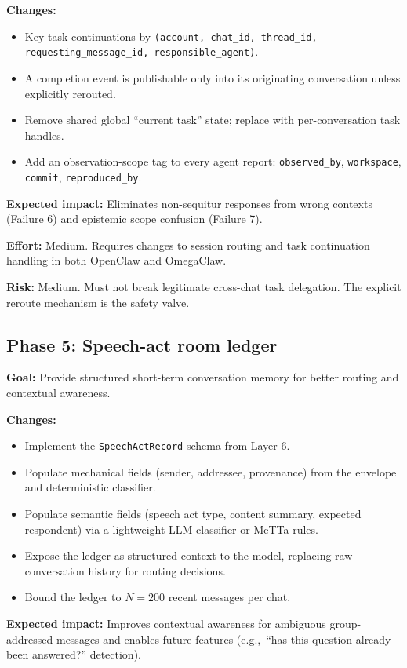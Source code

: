 \documentclass[11pt]{article}
\begin{document}
\textbf{Changes:}
\begin{itemize}
\item Key task continuations by \texttt{(account, chat\_id, thread\_id,
requesting\_message\_id, responsible\_agent)}.
\item A completion event is publishable only into its originating
conversation unless explicitly rerouted.
\item Remove shared global ``current task'' state; replace with per-conversation
task handles.
\item Add an observation-scope tag to every agent report:
\texttt{observed\_by}, \texttt{workspace}, \texttt{commit},
\texttt{reproduced\_by}.
\end{itemize}

\textbf{Expected impact:} Eliminates non-sequitur responses from wrong
contexts (Failure 6) and epistemic scope confusion (Failure 7).

\textbf{Effort:} Medium.  Requires changes to session routing and task
continuation handling in both OpenClaw and OmegaClaw.

\textbf{Risk:} Medium.  Must not break legitimate cross-chat task delegation.
The explicit reroute mechanism is the safety valve.

\subsection{Phase 5: Speech-act room ledger}

\textbf{Goal:} Provide structured short-term conversation memory for better
routing and contextual awareness.

\textbf{Changes:}
\begin{itemize}
\item Implement the \texttt{SpeechActRecord} schema from Layer 6.
\item Populate mechanical fields (sender, addressee, provenance) from the
envelope and deterministic classifier.
\item Populate semantic fields (speech act type, content summary, expected
respondent) via a lightweight LLM classifier or MeTTa rules.
\item Expose the ledger as structured context to the model, replacing raw
conversation history for routing decisions.
\item Bound the ledger to $N=200$ recent messages per chat.
\end{itemize}

\textbf{Expected impact:} Improves contextual awareness for ambiguous
group-addressed messages and enables future features (e.g.,\ ``has this
question already been answered?'' detection).
\end{document}
